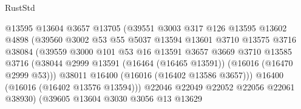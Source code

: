 \begin{lexlean}{RustStd}
\begin{coremodule}
                                    @13595
                                    @13604
                                    @3657
                                    @13705
                                    (@39551
                                      @3003
                                      @317
                                      @126
                                      @13595
                                      @13602
                                      @4898
                                      (@39560
                                        @3002
                                        @53
                                        @55
                                        @5037
                                        @13594
                                        @13601
                                        @3710
                                        @13575
                                        @3716
                                        @38084
                                        (@39559
                                          @3000
                                          @101
                                          @53
                                          @16
                                          @13591
                                          @3657
                                          @3669
                                          @3710
                                          @13585
                                          @3716
                                          (@38044
                                            @2999
                                            @13591
                                            (@16464 (@16465 @13591))
                                            (@16016 (@16470 @2999 @53)))
                                          @38011
                                          @16400
                                          (@16016 (@16402 @13586 @3657)))
                                        @16400
                                        (@16016 (@16402 @13576 @13594)))
                                      @22046
                                      @22049
                                      @22052
                                      @22056
                                      @22061
                                      @38930)
                                    (@39605
                                      @13604
                                      @3030
                                      @3056
                                      @13
                                      @13629

\end{coremodule}
\end{lexlean}
